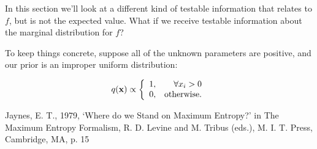 \documentclass[letterpaper, 11pt]{article}
\begin{document}
In this section we'll look at a different kind of testable information that
relates to $f$, but is not the expected value. What if we receive testable
information about the marginal distribution for $f$?

To keep things concrete, suppose all of the unknown parameters are positive,
and our prior is an improper uniform distribution:

\begin{eqnarray}
q(\mathbf{x}) \propto
\left\{
\begin{array}{lr}
1, & \forall x_i > 0\\
0, & \textnormal{otherwise}.
\end{array}
\right.
\end{eqnarray}

\begin{thebibliography}{}
Jaynes, E. T., 1979, `Where do we Stand on Maximum Entropy?' in The Maximum Entropy Formalism, R. D. Levine and M. Tribus (eds.), M. I. T. Press, Cambridge, MA, p. 15
\end{thebibliography}
\end{document}
